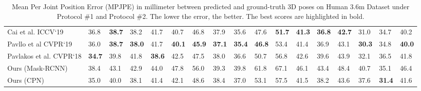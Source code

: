 \documentclass{article}
\begin{document}
\begin{table*}[t]
{\begin{tabular}{lllllllllllllllll}
Cai et al. \cite{Cai2019} ICCV‘19           & 36.8  & \textbf{38.7}  & 38.2  & 41.7  & 40.7  & 46.8  & 37.9  & 35.6   & 47.6  & \textbf{51.7}  & \textbf{41.3}  & \textbf{36.8}  & \textbf{42.7}   & 31.0  & {34.7}   & 40.2  \\
Pavllo et al \cite{Pavllo2019} CVPR‘19      & 36.0  & \textbf{38.7}  & \textbf{38.0}  & 41.7  & \textbf{40.1}  & \textbf{45.9}  & \textbf{37.1}  & \textbf{35.4}   & \textbf{46.8}  & 53.4  & 41.4  & 36.9  & 43.1   & \textbf{30.3}  & 34.8   & \textbf{40.0}  \\
Pavlakos et al. \cite{Pavlakos2018} CVPR‘18 & \textbf{34.7}  & 39.8  & 41.8  & \textbf{38.6}  & 42.5  & 47.5  & 38.0  & 36.6   & 50.7  & 56.8  & 42.6  & 39.6  & 43.9   & 32.1  & 36.5   & 41.8  \\
\hline
Ours  (Mask-RCNN)                                                      & 38.4         & 43.1         & 42.9         & 44.0          & 47.8         & 56.0         & 39.3         & 39.8         & 61.8         & 67.1         & 46.1        & 43.4         & 48.4         & 40.7         & 35.1         & 46.4        \\
Ours (CPN) & 35.0 & 40.0 & 38.1 & 41.4 & 42.1 & 48.6 & 38.4 & 37.0 & 53.1 & 57.5 & 41.5 & 38.2 & 43.6 & 37.6 & \textbf{31.4} & 41.6\\
\bottomrule
\end{tabular}
}
\caption{\label{tab:mpjpe}Mean Per Joint Position Error (MPJPE) in millimeter between predicted and ground-truth 3D poses on Human 3.6m Dataset under Protocol \#1 and Protocol \#2. The lower the error, the better. The best scores are highlighted in bold.}
\end{table*}

\begin{table}[]
\centering
{}
\caption{\label{tab:num_param}Number of parameters, Throughput (forward passes/second with batch size 1), and MPJPE (Protocol-1) of models. Higher throughput is better.}
\end{table}
\end{document}

